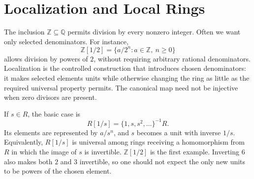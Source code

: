 \section{Localization and Local Rings}
The inclusion \(\mathbb Z\subseteq\mathbb Q\) permits division by every
nonzero integer.  Often we want only selected denominators.  For instance,
\[\mathbb Z[1/2]=\{a/2^n:a\in\mathbb Z,\ n\ge0\}\]
allows division by powers of \(2\), without requiring arbitrary rational
denominators.  Localization is the controlled construction that introduces
chosen denominators: it makes selected elements units while otherwise
changing the ring as little as the required universal property permits.
The canonical map need not be injective when zero divisors are present.

If \(s\in R\), the basic case is
\[R[1/s]=\{1,s,s^2,\ldots\}^{-1}R.\]
Its elements are represented by \(a/s^n\), and \(s\) becomes a unit with
inverse \(1/s\).  Equivalently, \(R[1/s]\) is universal among rings receiving
a homomorphism from \(R\) in which the image of \(s\) is invertible.
\(\mathbb Z[1/2]\) is the first example.  Inverting \(6\) also makes both
\(2\) and \(3\) invertible, so one should not expect the only new units to
be powers of the chosen element.

